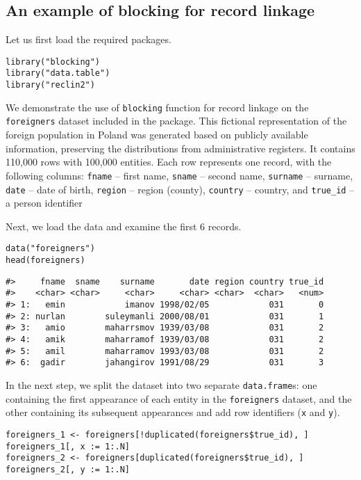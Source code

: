 \subsection{An example of blocking for record linkage}\label{an-example-of-blocking-for-record-linkage}

Let us first load the required packages.

\begin{verbatim}
library("blocking")
library("data.table")
library("reclin2")
\end{verbatim}

We demonstrate the use of \texttt{blocking} function for record linkage on the
\texttt{foreigners} dataset included in the package. This fictional
representation of the foreign population in Poland was generated based
on publicly available information, preserving the distributions from
administrative registers. It contains 110,000 rows with 100,000
entities. Each row represents one record, with the following columns:
\texttt{fname} -- first name, \texttt{sname} -- second name, \texttt{surname} -- surname,
\texttt{date} -- date of birth, \texttt{region} -- region (county), \texttt{country} -- country, and
\texttt{true\_id} -- a person identifier

Next, we load the data and examine the first 6 records.

\begin{verbatim}
data("foreigners")
head(foreigners)
\end{verbatim}

\begin{verbatim}
#>     fname  sname    surname       date region country true_id
#>    <char> <char>     <char>     <char> <char>  <char>   <num>
#> 1:   emin            imanov 1998/02/05            031       0
#> 2: nurlan        suleymanli 2000/08/01            031       1
#> 3:   amio        maharrsmov 1939/03/08            031       2
#> 4:   amik        maharramof 1939/03/08            031       2
#> 5:   amil        maharramov 1993/03/08            031       2
#> 6:  gadir        jahangirov 1991/08/29            031       3
\end{verbatim}

In the next step, we split the dataset into two separate \texttt{data.frame}s: one containing the first
appearance of each entity in the \texttt{foreigners} dataset, and the other
containing its subsequent appearances and add row identifiers (\texttt{x} and \texttt{y}).

\begin{verbatim}
foreigners_1 <- foreigners[!duplicated(foreigners$true_id), ]
foreigners_1[, x := 1:.N]
foreigners_2 <- foreigners[duplicated(foreigners$true_id), ]
foreigners_2[, y := 1:.N]
\end{verbatim}

